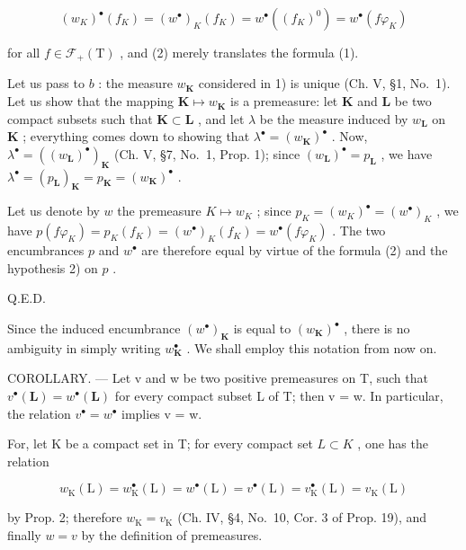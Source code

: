 \[
(w _ {K}) ^ {\bullet} (f _ {K}) = (w ^ {\bullet}) _ {K} (f _ {K}) = w ^ {\bullet} \left((f _ {K}) ^ {0}\right) = w ^ {\bullet} (f \varphi_ {K})
\]

for all \(f \in \mathcal{F}_{+}(\mathrm{T})\) , and (2) merely translates the formula (1).

Let us pass to \(b\) : the measure \(w_{\mathbf{K}}\) considered in 1) is unique (Ch. V, §1, No.~1). Let us show that the mapping \(\mathbf{K} \mapsto w_{\mathbf{K}}\) is a premeasure: let \(\mathbf{K}\) and \(\mathbf{L}\) be two compact subsets such that \(\mathbf{K} \subset \mathbf{L}\) , and let \(\lambda\) be the measure induced by \(w_{\mathbf{L}}\) on \(\mathbf{K}\) ; everything comes down to showing that \(\lambda^{\bullet} = (w_{\mathbf{K}})^{\bullet}\) . Now, \(\lambda^{\bullet} = ((w_{\mathbf{L}})^{\bullet})_{\mathbf{K}}\) (Ch. V, §7, No.~1, Prop. 1); since \((w_{\mathbf{L}})^{\bullet} = p_{\mathbf{L}}\) , we have \(\lambda^{\bullet} = (p_{\mathbf{L}})_{\mathbf{K}} = p_{\mathbf{K}} = (w_{\mathbf{K}})^{\bullet}\) .

Let us denote by \(w\) the premeasure \(K \mapsto w_K\) ; since \(p_K = (w_K)^{\bullet} = (w^{\bullet})_K\) , we have \(p(f\varphi_K) = p_K(f_K) = (w^{\bullet})_K(f_K) = w^{\bullet}(f\varphi_K)\) . The two encumbrances \(p\) and \(w^{\bullet}\) are therefore equal by virtue of the formula (2) and the hypothesis 2) on \(p\) .

Q.E.D.

Since the induced encumbrance \((w^{\bullet})_{\mathbf{K}}\) is equal to \((w_{\mathbf{K}})^{\bullet}\) , there is no ambiguity in simply writing \(w_{\mathbf{K}}^{\bullet}\) . We shall employ this notation from now on.

COROLLARY. --- Let v and w be two positive premeasures on T, such that \(v^{\bullet}(\mathbf{L}) = w^{\bullet}(\mathbf{L})\) for every compact subset L of T; then v = w. In particular, the relation \(v^{\bullet} = w^{\bullet}\) implies v = w.

For, let K be a compact set in T; for every compact set \(L \subset K\) , one has the relation

\[
w _ {\mathrm{K}} (\mathrm{L}) = w _ {\mathrm{K}} ^ {\bullet} (\mathrm{L}) = w ^ {\bullet} (\mathrm{L}) = v ^ {\bullet} (\mathrm{L}) = v _ {\mathrm{K}} ^ {\bullet} (\mathrm{L}) = v _ {\mathrm{K}} (\mathrm{L})
\]

by Prop. 2; therefore \(w_{\mathrm{K}} = v_{\mathrm{K}}\) (Ch. IV, §4, No.~10, Cor. 3 of Prop. 19), and finally \(w = v\) by the definition of premeasures.

